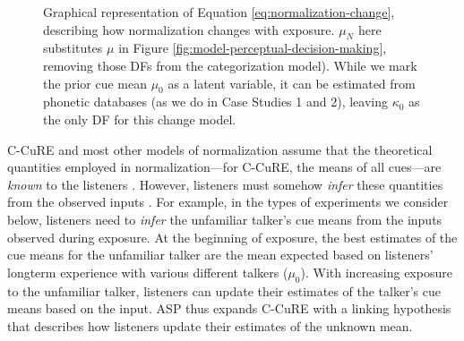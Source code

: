 \documentclass[
  11pt,
  man,floatsintext]{apa6}
\begin{document}
\begin{figure}
\centering
\caption{Graphical representation of Equation \ref{eq:normalization-change}, describing how normalization changes with exposure. $\mu_N$ here substitutes $\mu$ in Figure \ref{fig:model-perceptual-decision-making}, removing those DFs from the categorization model). While we mark the prior cue mean $\mu_0$ as a latent variable, it can be estimated from phonetic databases (as we do in  Case Studies 1 and 2), leaving $\kappa_0$ as the only DF for this change model.\label{fig:graphical-model-changes-normalization}}
\end{figure}

C-CuRE and most other models of normalization assume that the theoretical quantities employed in normalization---for C-CuRE, the means of all cues---are \emph{known} to the listeners \autocites[e.g.,][]{apfelbaum-mcmurray2015,mcmurray-jongman2011}. However, listeners must somehow \emph{infer} these quantities from the observed inputs \autocites[see also][]{barreda2012,magnuson-nusbaum2007,weatherholtz-jaeger2016}. For example, in the types of experiments we consider below, listeners need to \emph{infer} the unfamiliar talker's cue means from the inputs observed during exposure. At the beginning of exposure, the best estimates of the cue means for the unfamiliar talker are the mean expected based on listeners' longterm experience with various different talkers (\(\mu_0\)). With increasing exposure to the unfamiliar talker, listeners can update their estimates of the talker's cue means based on the input. ASP thus expands C-CuRE with a linking hypothesis that describes how listeners update their estimates of the unknown mean.
\end{document}
